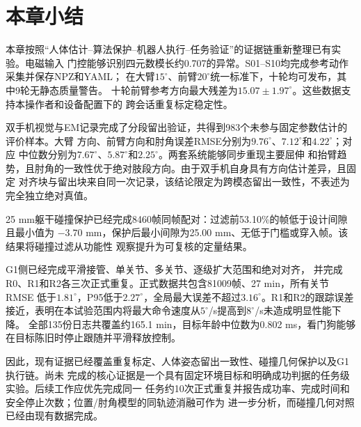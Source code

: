 \section{本章小结}
\label{sec:ch7_summary}

本章按照“人体估计--算法保护--机器人执行--任务验证”的证据链重新整理已有实验。电磁输入
门控能够识别四元数模长约0.707的异常。S01--S10均完成参考动作采集并保存NPZ和YAML；
在大臂$15^\circ$、前臂$20^\circ$统一标准下，十轮均可发布，其中9轮无静态质量警告。
十轮前臂参考方向最大残差为$15.07\pm1.97^\circ$。这些数据支持本操作者和设备配置下的
跨会话重复标定稳定性。

双手机视觉与EM记录完成了分段留出验证，共得到983个未参与固定参数估计的评价样本。大臂
方向、前臂方向和肘角误差RMSE分别为$9.76^\circ$、$7.12^\circ$和$4.22^\circ$；对应
中位数分别为$7.67^\circ$、$5.87^\circ$和$2.25^\circ$。两套系统能够同步重现主要屈伸
和抬臂趋势，且肘角的一致性优于绝对肢段方向。由于双手机自身具有方向估计差异，且固定
对齐块与留出块来自同一次记录，该结论限定为跨模态留出一致性，不表述为完全独立绝对真值。

25 mm躯干碰撞保护已经完成8460帧同帧配对：过滤前53.10\%的帧低于设计间隙且最小值为
$-3.70$ mm，保护后最小间隙为25.00 mm、无低于门槛或穿入帧。该结果将碰撞过滤从功能性
观察提升为可复核的定量结果。

G1侧已经完成平滑接管、单关节、多关节、逐级扩大范围和绝对对齐，
并完成R0、R1和R2各三次正式重复。正式数据共包含81009帧、27 min，所有关节RMSE
低于$1.81^\circ$，P95低于$2.27^\circ$，全局最大误差不超过$3.16^\circ$。R1和R2的跟踪误差
接近，表明在本试验范围内将最大命令速度从$5^\circ$/s提高到$8^\circ$/s未造成明显性能下降。
全部135份日志共覆盖约165.1 min，目标年龄中位数为0.802 ms，看门狗能够在目标陈旧时停止跟随并平滑释放控制。

因此，现有证据已经覆盖重复标定、人体姿态留出一致性、碰撞几何保护以及G1执行链。尚未
完成的核心证据是一个具有固定环境目标和明确成功判据的任务级实验。后续工作应优先完成同一
任务约10次正式重复并报告成功率、完成时间和安全停止次数；位置/肘角模型的同轨迹消融可作为
进一步分析，而碰撞几何对照已经由现有数据完成。
